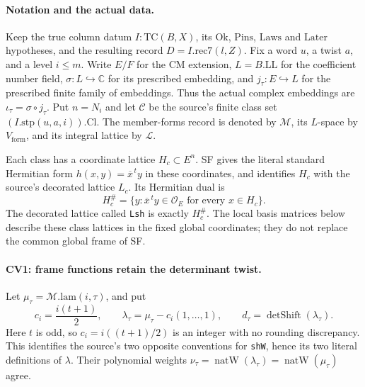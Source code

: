 \documentclass[11pt,a4paper]{article}
\numberwithin{equation}{section}
\theoremstyle{remark}\newtheorem{remark}[theorem]{Remark}
\begin{document}
\paragraph{Notation and the actual data.}
Keep the true column datum \(I:\mathrm{TC}(B,X)\), its
\(\mathrm{Ok}\), \(\mathrm{Pins}\), \(\mathrm{Laws}\) and
\(\mathrm{Later}\) hypotheses, and the resulting record
\(D=I.\mathrm{rec7}(l,Z)\). Fix a word \(u\), a twist \(a\), and
a level \(i\le m\). Write \(E/F\) for the CM extension,
\(L=B.\mathrm{LL}\) for the coefficient number field,
\(\sigma:L\hookrightarrow\mathbb C\) for its prescribed embedding,
and \(j_\tau:E\hookrightarrow L\) for the prescribed finite family
of embeddings. Thus the actual complex embeddings are
\(\iota_\tau=\sigma\circ j_\tau\). Put \(n=N_i\) and let
\(\mathcal C\) be the source's finite class set
\((I.\mathrm{stp}(u,a,i)).\mathrm{Cl}\).
The member-forms record is denoted by \(\mathcal M\), its
\(L\)-space by \(V_{\mathrm{form}}\), and its integral lattice
by \(\mathcal L\).

Each class has a coordinate lattice \(H_c\subset E^n\).
SF gives the literal standard Hermitian form
\(h(x,y)=\overline{x}^{\,t}y\) in these coordinates, and
identifies \(H_c\) with the source's decorated lattice \(L_c\).
Its Hermitian dual is
\[
 H_c^\#=\{y:\overline{x}^{\,t}y\in\mathcal O_E
                           \text{ for every }x\in H_c\}.
\]
The decorated lattice called \texttt{Lsh} is exactly \(H_c^\#\).
The local basis matrices below describe these class lattices in
the fixed global coordinates; they do not replace the common
global frame of SF.

\paragraph{CV1: frame functions retain the determinant twist.}
Let \(\mu_\tau=\mathcal M.\mathrm{lam}(i,\tau)\), and put
\[
 c_i=\frac{i(t+1)}2,\qquad
 \lambda_\tau=\mu_\tau-c_i(1,\ldots,1),\qquad
 d_\tau=\operatorname{detShift}(\lambda_\tau).
                                                               \tag{CV.1}
\]
Here \(t\) is odd, so \(c_i=i((t+1)/2)\) is an integer with
no rounding discrepancy. This identifies the source's two
opposite conventions for \texttt{shW}, hence its two literal
definitions of \(\lambda\). Their polynomial weights
\(\nu_\tau=\operatorname{natW}(\lambda_\tau)
=\operatorname{natW}(\mu_\tau)\) agree.
\end{document}
